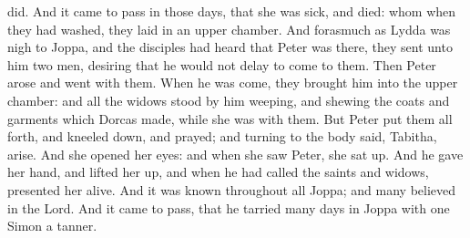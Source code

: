 {did.
And it came to
pass
in
those
days, that
she was
sick, and
died:
whom when they had
washed, they
laid
{}
in an upper
chamber.
And forasmuch
as
Lydda was
nigh to
Joppa,
and the
disciples had
heard
that
Peter
was
there, they
sent
unto
him
two
men,
desiring
{}
that he
would
not
delay to
come
to
them.
Then
Peter
arose and
went with
them.
When he was
come, they brought
him
into the upper
chamber:
and
all the
widows stood
by
him
weeping,
and
shewing the
coats
and
garments
which
Dorcas
made, while she
was
with
them.
But
Peter put
them
all
forth, and kneeled
down, and
prayed;
and
turning
{}
to the
body
said,
Tabitha,
arise.
And she
opened
her
eyes:
and when she
saw
Peter, she sat
up.
And he
gave
her
{}
hand, and
lifted
her
up,
and when he had
called the
saints
and
widows,
presented
her
alive.
And it
was
known
throughout
all
Joppa;
and
many
believed
in the
Lord.
And it came to
pass, that
he
tarried
many
days
in
Joppa
with
one
Simon a
tanner.

}
